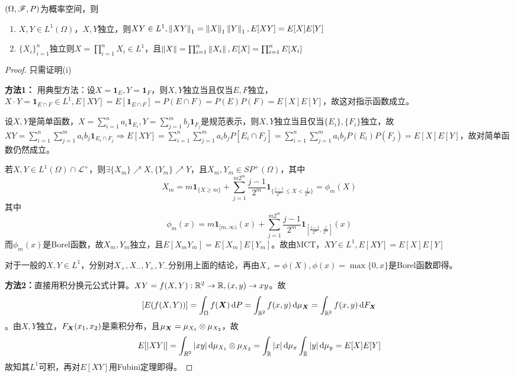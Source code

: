 \documentclass{ctexart}
\begin{document}
\begin{Prop}
  $(\Omega,\mathscr{F}, P)$为概率空间，则
  \begin{enumerate}
  \item $X,Y\in L^{1}(\Omega)$，$X,Y$独立，则$XY\in L^{1}, \left\|XY\right\|_{1}=\left\|X\right\|_{1}\left\|Y\right\|_{1},E[XY]=E[X]E[Y]$
  \item $\{X_{i}\}_{i=1}^{n}$独立则$X=\prod_{i=1}^{n}X_{i}\in L^{1}$，且$\left\|X\right\|=\prod_{i=1}^{n}\left\|X_{i}\right\|, E[X]=\prod_{i=1}^{n}E[X_{i}]$
  \end{enumerate}
\end{Prop}
\begin{proof}
  只需证明(i)

  \textbf{方法1：} 用典型方法：设$X=\bm{1}_{E},Y=\bm{1}_{F}$，则$X,Y$独立当且仅当$E,F$独立，$X\cdot Y=\bm{1}_{E\cap F}\in L^{1},E[XY]=E[\bm{1}_{E\cap F}]=P(E\cap F)=P(E)P(F)=E[X]E[Y]$，故这对指示函数成立。

  设$X,Y$是简单函数，$X=\sum\limits_{i=1}^{n} a_{i}\bm{1}_{E_{i}}, Y=\sum\limits_{j=1}^{m} b_{j}\bm{1}_{F_{j}}$是规范表示，则$X,Y$独立当且仅当$\{E_{i}\},\{F_{i}\}$独立，故$XY=\sum\limits_{i=1}^{n}\sum\limits_{j=1}^{m} a_{i}b_{j}\bm{1}_{E_{i}\cap F_{j}}\Rightarrow E[XY]=\sum\limits_{i=1}^{n}\sum\limits_{j=1}^{m} a_{i}b_{j}P[E_{i}\cap F_{j}]=\sum\limits_{i=1}^{n}\sum\limits_{j=1}^{m} a_{i}b_{j}P(E_{i})P(F_{j})=E[X]E[Y]$，故对简单函数仍然成立。

  若$X,Y\in L^{1}(\Omega)\cap \mathcal{L}^{+}$，则$\exists \{X_{m}\}\nearrow X,\{Y_{m}\}\nearrow Y$，且$X_{m},Y_{m}\in SP^{+}(\Omega)$，其中
  \[X_{m}=m\bm{1}_{\{X\geq m\}}+\sum_{j=1}^{m2^{m}}\frac{j-1}{2^{m}}\bm{1}_{\{\frac{j-1}{2^{m}}\leq X<\frac{j}{2^{m}}\}}=\phi_{m}(X)\]
  其中
  \[\phi_{m}(x)=m\bm{1}_{[m,\infty)}(x)+\sum_{j=1}^{m2^{m}}\frac{j-1}{2^{m}}\bm{1}_{[\frac{j-1}{2^{m}},\frac{j}{2^{m}}]}(x)\]
  而$\phi_{m}(x)$是Borel函数，故$X_{m},Y_{m}$独立，且$E[X_{m}Y_{m}]=E[X_{m}]E[Y_{m}]$。故由MCT，$XY\in L^{1},E[XY]=E[X]E[Y]$

  对于一般的$X,Y\in L^{1}$，分别对$X_{+},X_{-},Y_{+},Y_{-}$分别用上面的结论，再由$X_{+}=\phi(X),\phi(x)=\max\{0,x\}$是Borel函数即得。

  \textbf{方法2：}直接用积分换元公式计算。$XY=f(X,Y):\mathbb{R}^{2}\to\mathbb{R}, (x,y)\to xy$。故
  \[[E(f(X,Y))]=\int_{\Omega}f(\bm{X})\,\mathrm{d} P=\int_{\mathbb{R}^{2}}f(x,y)\,\mathrm{d}\mu_{\bm{X}}=\int_{\mathbb{R}^{2}}f(x,y)\,\mathrm{d} F_{\bm{X}}\]
  。由$X,Y$独立，$F_{\bm{X}}(x_{1},x_{2})$是乘积分布，且$\mu_{\bm{X}}=\mu_{X_{1}}\otimes \mu_{X_{2}}$，故
  \[E[|XY|]=\int_{R^{2}}|xy|\,\mathrm{d}\mu_{X_{1}}\otimes \mu_{X_{2}}=\int_{\mathbb{R}}|x|\,\mathrm{d}\mu_{x}\int_{\mathbb{R}}|y|\,\mathrm{d} \mu_{y}=E[X]E[Y]\]
  故知其$L^{1}$可积，再对$E[XY]$用Fubini定理即得。
\end{proof}
\end{document}

